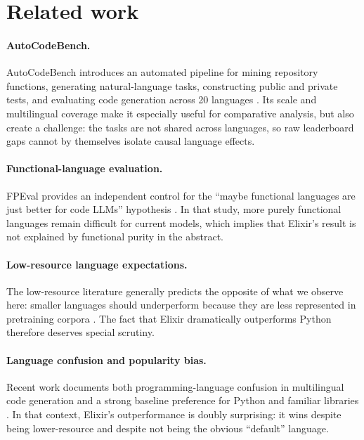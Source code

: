 \documentclass[11pt]{article}
\newcommand{\acb}{AutoCodeBench}
\newcommand{\elixir}{Elixir}
\newcommand{\pythonlang}{Python}
\begin{document}
\section{Related work}

\paragraph{AutoCodeBench.}
\acb{} introduces an automated pipeline for mining repository functions, generating natural-language tasks, constructing public and private tests, and evaluating code generation across 20 languages \cite{acb}. Its scale and multilingual coverage make it especially useful for comparative analysis, but also create a challenge: the tasks are not shared across languages, so raw leaderboard gaps cannot by themselves isolate causal language effects.

\paragraph{Functional-language evaluation.}
FPEval provides an independent control for the ``maybe functional languages are just better for code LLMs'' hypothesis \cite{fpeval}. In that study, more purely functional languages remain difficult for current models, which implies that \elixir{}'s result is not explained by functional purity in the abstract.

\paragraph{Low-resource language expectations.}
The low-resource literature generally predicts the opposite of what we observe here: smaller languages should underperform because they are less represented in pretraining corpora \cite{lowresource}. The fact that \elixir{} dramatically outperforms \pythonlang{} therefore deserves special scrutiny.

\paragraph{Language confusion and popularity bias.}
Recent work documents both programming-language confusion in multilingual code generation \cite{plconfusion} and a strong baseline preference for Python and familiar libraries \cite{llmpreferences}. In that context, \elixir{}'s outperformance is doubly surprising: it wins despite being lower-resource and despite not being the obvious ``default'' language.
\end{document}
